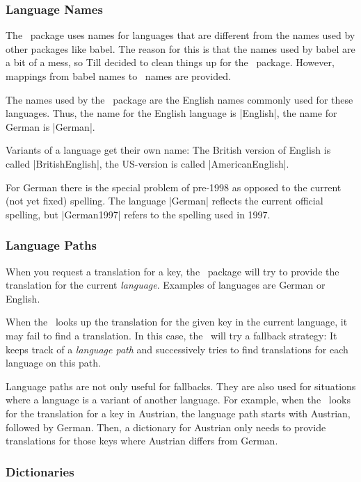 \subsubsection{Language Names}

The \translatorname\ package uses names for languages that are different from the names used by other packages like babel. The reason for this is that the names used by babel are a bit of a mess, so Till decided to clean things up for the \translatorname\ package. However, mappings from babel names to \translatorname\ names are provided.

The names used by the \translatorname\ package are the English names commonly used for these languages. Thus, the name for the English language is |English|, the name for German is |German|.

Variants of a language get their own name: The British version of English is called |BritishEnglish|, the US-version is called |AmericanEnglish|.

For German there is the special problem of pre-1998 as opposed to the current (not yet fixed) spelling. The language |German| reflects the current official spelling, but |German1997| refers to the spelling used in 1997.

\subsubsection{Language Paths}

When you request a translation for a key, the \translatorname\ package will try to provide the translation for the current \emph{language}. Examples of languages are German or English.

When the \translatorname\ looks up the translation for the given key in the current language, it may fail to find a translation. In this case, the \translatorname\ will try a fallback strategy: It keeps track of a \emph{language path} and successively tries to find translations for each language on this path.

Language paths are not only useful for fallbacks. They are also used for situations where a language is a variant of another language. For example, when the \translatorname\ looks for the translation for a key in Austrian, the language path starts with Austrian, followed by German. Then, a dictionary for Austrian only needs to provide translations for those keys where Austrian differs from German.

\subsubsection{Dictionaries}

